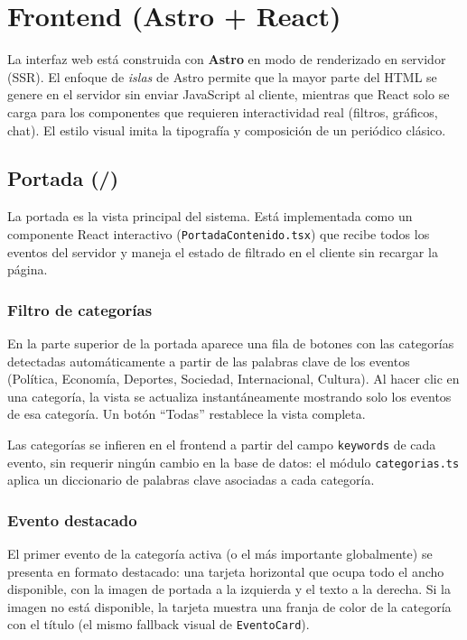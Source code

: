 \documentclass[12pt,a4paper]{article}
\begin{document}
\section{Frontend (Astro + React)}

La interfaz web está construida con \textbf{Astro} en modo de renderizado en servidor (SSR). El enfoque de \textit{islas} de Astro permite que la mayor parte del HTML se genere en el servidor sin enviar JavaScript al cliente, mientras que React solo se carga para los componentes que requieren interactividad real (filtros, gráficos, chat). El estilo visual imita la tipografía y composición de un periódico clásico.

\subsection{Portada (/)}

La portada es la vista principal del sistema. Está implementada como un componente React interactivo (\texttt{PortadaContenido.tsx}) que recibe todos los eventos del servidor y maneja el estado de filtrado en el cliente sin recargar la página.

\subsubsection*{Filtro de categorías}

En la parte superior de la portada aparece una fila de botones con las categorías detectadas automáticamente a partir de las palabras clave de los eventos (Política, Economía, Deportes, Sociedad, Internacional, Cultura). Al hacer clic en una categoría, la vista se actualiza instantáneamente mostrando solo los eventos de esa categoría. Un botón ``Todas'' restablece la vista completa.

Las categorías se infieren en el frontend a partir del campo \texttt{keywords} de cada evento, sin requerir ningún cambio en la base de datos: el módulo \texttt{categorias.ts} aplica un diccionario de palabras clave asociadas a cada categoría.

\subsubsection*{Evento destacado}

El primer evento de la categoría activa (o el más importante globalmente) se presenta en formato destacado: una tarjeta horizontal que ocupa todo el ancho disponible, con la imagen de portada a la izquierda y el texto a la derecha. Si la imagen no está disponible, la tarjeta muestra una franja de color de la categoría con el título (el mismo fallback visual de \texttt{EventoCard}).
\end{document}
